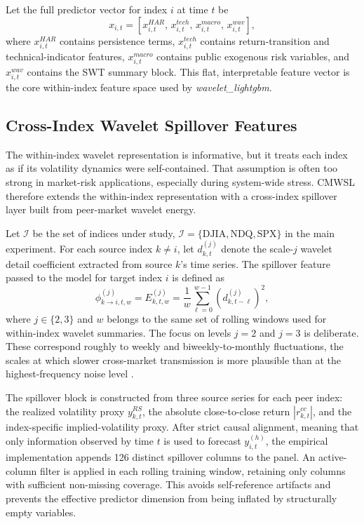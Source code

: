 Let the full predictor vector for index \(i\) at time \(t\) be
\[
x_{i,t}=
\left[
x_{i,t}^{HAR},\,
x_{i,t}^{tech},\,
x_{i,t}^{macro},\,
x_{i,t}^{wav}
\right],
\]
where \(x_{i,t}^{HAR}\) contains persistence terms, \(x_{i,t}^{tech}\) contains return-transition and technical-indicator features, \(x_{i,t}^{macro}\) contains public exogenous risk variables, and \(x_{i,t}^{wav}\) contains the SWT summary block. This flat, interpretable feature vector is the core within-index feature space used by \textit{wavelet\_lightgbm}.

\subsection{Cross-Index Wavelet Spillover Features}
\label{subsec:spillover_features}

The within-index wavelet representation is informative, but it treats each index as if its volatility dynamics were self-contained. That assumption is often too strong in market-risk applications, especially during system-wide stress. CMWSL therefore extends the within-index representation with a cross-index spillover layer built from peer-market wavelet energy.

Let \(\mathcal{I}\) be the set of indices under study, \(\mathcal{I}=\{\text{DJIA},\text{NDQ},\text{SPX}\}\) in the main experiment. For each source index \(k\neq i\), let \(d_{k,t}^{(j)}\) denote the scale-\(j\) wavelet detail coefficient extracted from source \(k\)'s time series. The spillover feature passed to the model for target index \(i\) is defined as
\[
\phi_{k\to i,t,w}^{(j)}=
E_{k,t,w}^{(j)}
=
\frac{1}{w}\sum_{\ell=0}^{w-1}\left(d_{k,t-\ell}^{(j)}\right)^2,
\]
where \(j\in\{2,3\}\) and \(w\) belongs to the same set of rolling windows used for within-index wavelet summaries. The focus on levels \(j=2\) and \(j=3\) is deliberate. These correspond roughly to weekly and biweekly-to-monthly fluctuations, the scales at which slower cross-market transmission is more plausible than at the highest-frequency noise level \cite{son2023gnnspillover,souropanis2023wavelet}.

The spillover block is constructed from three source series for each peer index: the realized volatility proxy \(y_{k,t}^{RS}\), the absolute close-to-close return \(|r_{k,t}^{cc}|\), and the index-specific implied-volatility proxy. After strict causal alignment, meaning that only information observed by time \(t\) is used to forecast \(y_{i,t}^{(h)}\), the empirical implementation appends 126 distinct spillover columns to the panel. An active-column filter is applied in each rolling training window, retaining only columns with sufficient non-missing coverage. This avoids self-reference artifacts and prevents the effective predictor dimension from being inflated by structurally empty variables.

